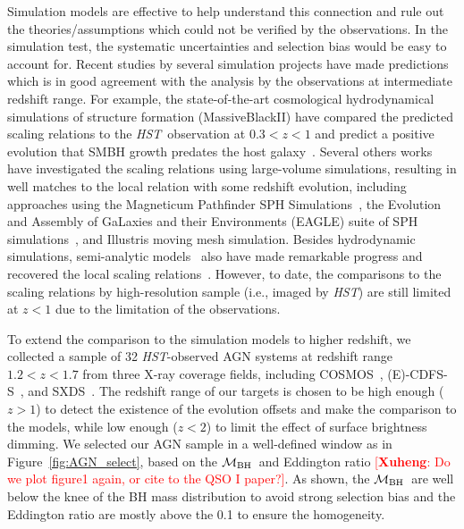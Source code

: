 \documentclass{natureprintstyle}
\newcommand{\hst}{{\it HST}}
\newcommand{\mbh}{$\mathcal M_{\rm BH}$}
\newcommand{\ding}[1]{\textcolor{red}{[{\bf Xuheng}: #1]}}
\begin{document}
Simulation models are effective to help understand this connection and rule out the theories/assumptions which could not be verified by the observations. In the simulation test, the systematic uncertainties and selection bias would be easy to account for. Recent studies by several simulation projects have made predictions which is in good agreement with the analysis by the observations at intermediate redshift range. For example, the state-of-the-art cosmological hydrodynamical simulations of structure formation (MassiveBlackII) have compared the predicted scaling relations to the \hst\ observation at $0.3<z<1$ and predict a positive evolution that SMBH growth predates the host galaxy~\cite{DeG++15}. Several others works have investigated the scaling relations using large-volume simulations, resulting in well matches to the local relation with some redshift evolution, including approaches using the Magneticum Pathfinder SPH Simulations~\cite{Steinborn2015}, the Evolution and Assembly of GaLaxies and their Environments (EAGLE) suite of SPH simulations~\cite{Schaye2015}, and Illustris moving mesh simulation\cite{Sijacki2015, Vogelsberger2014}. Besides hydrodynamic simulations, semi-analytic models~\cite{Menci2014, Menci2016} also have made remarkable progress and recovered the local scaling relations~\cite{Kormendy13}. However, to date, the comparisons to the scaling relations by high-resolution sample (i.e., imaged by \hst) are still limited at $z<1$ due to the limitation of the observations.

To extend the comparison to the simulation models to higher redshift, we collected a sample of 32 \hst-observed AGN systems at redshift range $1.2<z<1.7$ from three X-ray coverage fields, including COSMOS~\cite{Civano2016}, (E)-CDFS-S~\cite{Lehmer2005, Xue2011}, and SXDS~\cite{Ueda2008}. The redshift range of our targets is chosen to be high enough ($z>1$) to detect the existence of the evolution offsets and make the comparison to the models, while low enough ($z<2$) to limit the effect of surface brightness dimming. We selected our AGN sample in a well-defined window as in Figure~\ref{fig:AGN_select}, based on the \mbh\ and Eddington ratio \ding{Do we plot figure1 again, or cite to the QSO I paper?}. As shown, the \mbh\ are well below the knee of the BH mass distribution to avoid strong selection bias and the Eddington ratio are mostly above the 0.1 to ensure the homogeneity.
\end{document}

